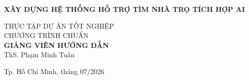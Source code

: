 \begin{titlepage}
\begin{center}

{ \Large \bfseries  XÂY DỰNG HỆ THỐNG HỖ TRỢ TÌM NHÀ TRỌ TÍCH HỢP AI \\[2cm] }


\large THỰC TẬP DỰ ÁN TỐT NGHIỆP\\
\large CHƯƠNG TRÌNH CHUẨN\\[1cm]

\textbf{GIẢNG VIÊN HƯỚNG DẪN}\\
ThS. Phạm Minh Tuấn


\vfill
Tp. Hồ Chí Minh, tháng 07/2026

\end{center}
\end{titlepage}
